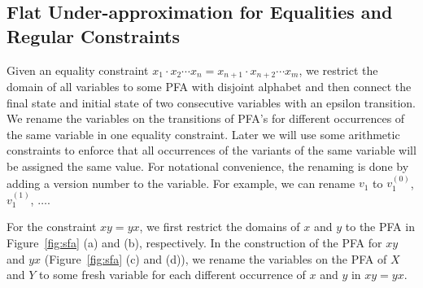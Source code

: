 \documentclass[sigplan,review,anonymous]{acmart}\settopmatter{printfolios=true,printccs=false,printacmref=false}
\begin{document}
\subsection{Flat Under-approximation for Equalities and Regular Constraints} \label{section:eq}

Given an equality constraint $x_1\cdot x_2 \cdots x_n = x_{n+1}\cdot x_{n+2} \cdots x_m$, we restrict the domain of all variables to some PFA with disjoint alphabet and then connect the final state and initial state of two consecutive variables with an epsilon transition. We rename the variables on the transitions of PFA's for different occurrences of the same variable in one equality constraint. Later we will use some arithmetic constraints to enforce that all occurrences of the variants of the same variable will be assigned the same value. For notational convenience, the renaming is done by adding a version number to the variable. For example, we can rename $v_1$ to $v_1^{(0)}$, $v_1^{(1)}$, $\ldots$.

For the constraint $xy = yx$, we first restrict the domains of $x$ and $y$ to the PFA in Figure~\ref{fig:sfa} (a) and (b), respectively. In the construction of the PFA for $xy$ and $yx$ (Figure~\ref{fig:sfa} (c) and (d)), we rename the variables on the PFA of $X$ and $Y$ to some fresh variable for each different occurrence of $x$ and $y$ in $xy = yx$.
\end{document}
